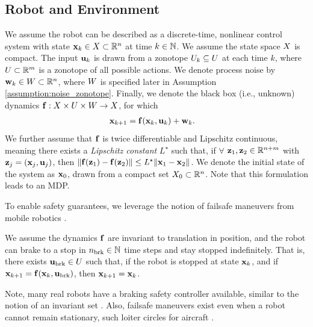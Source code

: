 \subsection{Robot and Environment}
We assume the robot can be described as a discrete-time, nonlinear control system with state ${\mathbf{x}}_{k} \in X \subset {\mathbb{R}}^n$ at time $k \in {\mathbb{N}}$.
We assume the state space $X$ is compact.
The input ${\mathbf{u}}_{k}$ is drawn from a zonotope $U_k \subseteq U$ at each time $k$, where $U \subset {\mathbb{R}}^m$ is a zonotope of all possible actions.
We denote process noise by ${\mathbf{w}}_{k} \in W \subset {\mathbb{R}}^n$, where $W$ is specified later in Assumption \ref{assumption:noise_zonotope}.
Finally, we denote the black box (i.e., unknown) dynamics ${\mathbf{f}}: X\times U\times W \to X$, for which
\begin{align}\label{eq:sys}
        {\mathbf{x}}_{k+1} &=  {\mathbf{f}}({\mathbf{x}}_{k}, {\mathbf{u}}_{k}) + {\mathbf{w}}_{k}.
\end{align}
We further assume that ${\mathbf{f}}$ is twice differentiable and Lipschitz continuous, meaning there exists a \emph{Lipschitz constant} $L^\star$ such that, if $\forall$ ${\mathbf{z}}_1, {\mathbf{z}}_2 \in {\mathbb{R}}^{n+m}$ with ${\mathbf{z}}_j= ({\mathbf{x}}_j,{\mathbf{u}}_j)$, then $\lVert{\mathbf{f}}({\mathbf{z}}_1) - {\mathbf{f}}({\mathbf{z}}_2)\rVert \leq L^\star \lVert{\mathbf{x}}_1 - {\mathbf{x}}_2\rVert$.
We denote the initial state of the system as ${\mathbf{x}}_{0}$, drawn from a compact set $X_{0} \subset {\mathbb{R}}^n$.
Note that this formulation leads to an MDP.

To enable safety guarantees, we leverage the notion of failsafe maneuvers from mobile robotics \cite{kousik2020bridging,magdici2016fail}. %
\begin{assumption}\label{assumption:stop}
We assume the dynamics ${\mathbf{f}}$ are invariant to translation in position, and the robot can brake to a stop in ${n_{\mathrm{\textnormal{brk}}}} \in {\mathbb{N}}$ time steps and stay stopped indefinitely.
That is, there exists ${\mathbf{u}}_{\mathrm{\textnormal{brk}}} \in U$ such that, if the robot is stopped at state ${\mathbf{x}}_k$, and if ${\mathbf{x}}_{k+1} = {\mathbf{f}}({\mathbf{x}}_k,{\mathbf{u}}_{\mathrm{\textnormal{brk}}})$, then ${\mathbf{x}}_{k+1} = {\mathbf{x}}_k$.
\end{assumption}
\noindent Note, many real robots have a braking safety controller available, similar to the notion of an invariant set \cite{LewEtAl2021,conf:modelBasedReachRL}.
Also, failsafe maneuvers exist even when a robot cannot remain stationary, such loiter circles for aircraft \cite{fridovich2019safely,althoff2015online}.

